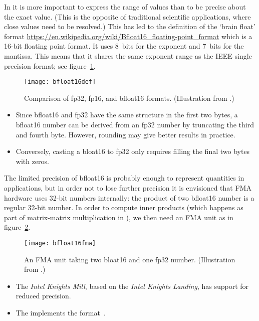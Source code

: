 In  it is more important to express the range of values
than to be precise about the exact value. (This is the opposite of
traditional scientific applications, where close values need to be
resolved.)  This has led to the definition of the
 `brain float' format
\url{https://en.wikipedia.org/wiki/Bfloat16_floating-point_format}
which is a 16-bit
floating point format. It uses 8~bits for the exponent and 7~bits for
the mantissa. This means that it shares the same exponent range as the
IEEE single precision format; see figure~\ref{fig:bfloat16def}.

\begin{figure}[ht]
  \texttt{[image: bfloat16def]}  
  \caption{Comparison of fp32, fp16, and bfloat16
    formats. (Illustration from \cite{Intel:bfloat16}.)}
  \label{fig:bfloat16def}
\end{figure}

\begin{itemize}
\item Since bfloat16 and fp32 have the same structure in the first two bytes,
  a bfloat16 number can be derived from an fp32 number by
  truncating the third and fourth byte. However, rounding may give
  better results in practice.
\item Conversely, casting a bloat16 to fp32 only requires filling the
  final two bytes with zeros.
\end{itemize}

The limited precision of bfloat16 is probably enough to represent
quantities in  applications, but in order not to lose
further precision it is envisioned that \ac{FMA} hardware uses 32-bit
numbers internally: the product of two bfloat16 number is a regular
32-bit number. In order to compute inner products (which happens as
part of matrix-matrix multiplication in ), we then need an
\ac{FMA} unit as in figure~\ref{fig:bfloat16fma}.

\begin{figure}[ht]
  \texttt{[image: bfloat16fma]}
  \caption{An FMA unit taking two bloat16 and one fp32
    number. (Illustration from \cite{Intel:bfloat16}.)}
  \label{fig:bfloat16fma}
\end{figure}

\begin{itemize}
\item The 
  \emph{Intel Knights Mill}, based
  on the \emph{Intel Knights Landing}, 
  has support for reduced precision.
\item The  implements the
   format~\cite{Intel:bfloat16}.
\end{itemize}

